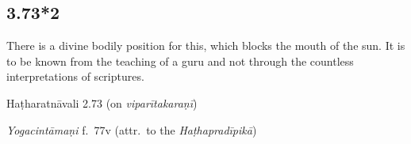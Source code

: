 \begin{ekdosis}
\begin{philcomm}[hp03_073_1]

%
\end{philcomm}



\subsection*{3.73*2}
\begin{translation}[hp03_073_2]
There is a divine bodily position for this, which blocks the mouth of the sun. It is to be known from the teaching of a guru and not through the countless interpretations of scriptures.
\end{translation}

\begin{sources}[hp03_073_2]
\end{sources}

\begin{testimonia}[hp03_073_2]
Haṭharatnāvali 2.73 (on \emph{viparītakaraṇī})
\begin{versinnote}
\end{versinnote}

\emph{Yogacintāmaṇi} f.~77v (attr.~to the \emph{Haṭhapradīpikā})
\begin{versinnote}
\end{versinnote}

\end{testimonia}





\end{ekdosis}

